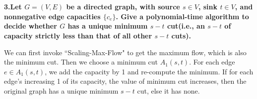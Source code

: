 
\chapter{}
\textbf{
3.Let $G=(V,E)$ be a directed graph, with source $s\in V$, sink $t\in V$, and nonnegative edge capacities $\{c_e\}$. Give a polynomial-time algorithm to decide whether $G$ has a unique minimum $s-t$ cut(i.e., an $s-t$ of capacity strictly less than that of all other $s-t$ cuts).
}

We can first invoke ``Scaling-Max-Flow" to get the maximum flow, which is also the minimum cut. 
Then we choose a minimum cut $A_1(s,t)$. 
For each edge $e\in A_1(s,t)$, we add the capacity by 1 and re-compute the minimum. 
If for each edge's increasing 1 of its capacity, the value of minimum cut increases, 
then the original graph has a unique minimum $s-t$ cut, else it has none.





